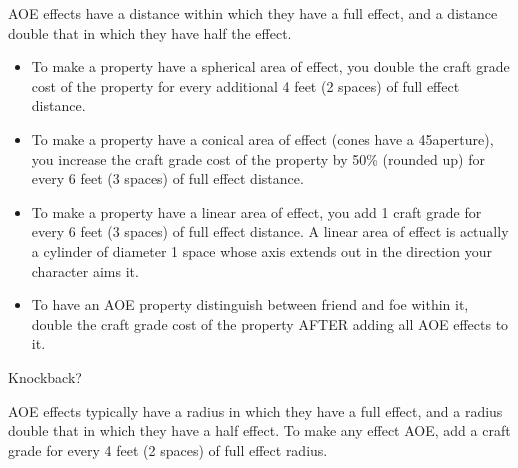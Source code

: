 \begin{description}
	AOE effects have a distance within which they have a full effect, and a distance double that in which they have half the effect.
	\begin{itemize}
		\item To make a property have a spherical area of effect, you double the craft grade cost of the property for every additional 4 feet (2 spaces) of full effect distance.
		\item To make a property have a conical area of effect (cones have a 45\degree   aperture), you increase the craft grade cost of the property by 50\% (rounded up) for every 6 feet (3 spaces) of full effect distance.
		\item To make a property have a linear area of effect, you add 1 craft grade for every 6 feet (3 spaces) of full effect distance. A linear area of effect is actually a cylinder of diameter 1 space whose axis extends out in the direction your character aims it.
		\item To have an AOE property distinguish between friend and foe within it, double the craft grade cost of the property AFTER adding all AOE effects to it.
	\end{itemize}
\end{description}

Knockback?

AOE effects typically have a radius in which they have a full effect, and a radius double that in which they have a half effect. To make any effect AOE, add a craft grade for every 4 feet (2 spaces) of full effect radius.

